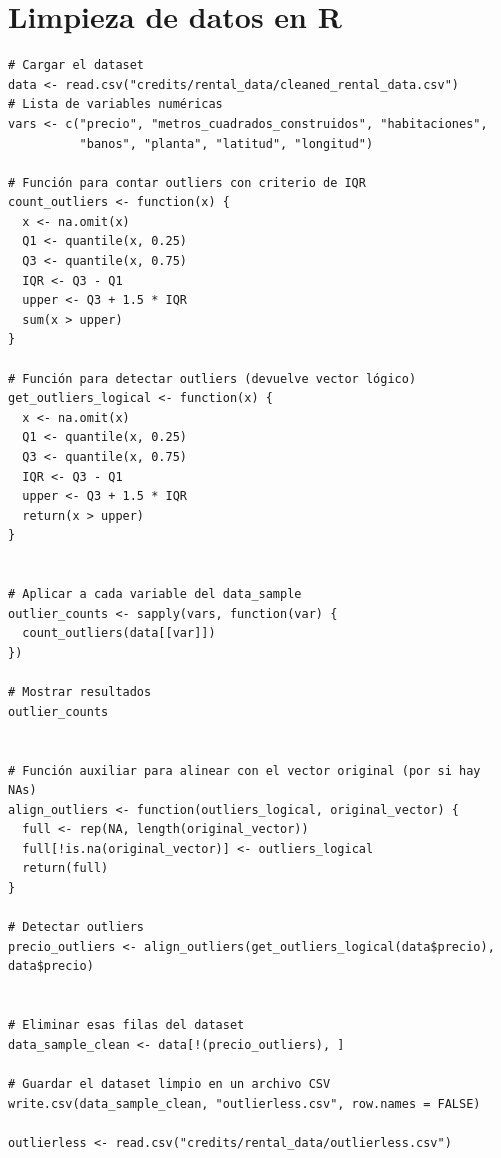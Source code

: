 \documentclass[11pt]{book}
\theoremstyle{plain} %
\theoremstyle{definition} %
\begin{document}
\section{Limpieza de datos en R}
 \begin{lstlisting}[style=rstyle, caption=clean\_data.R]
   # Cargar el dataset
data <- read.csv("credits/rental_data/cleaned_rental_data.csv")
# Lista de variables numéricas
vars <- c("precio", "metros_cuadrados_construidos", "habitaciones", 
          "banos", "planta", "latitud", "longitud")

# Función para contar outliers con criterio de IQR
count_outliers <- function(x) {
  x <- na.omit(x)
  Q1 <- quantile(x, 0.25)
  Q3 <- quantile(x, 0.75)
  IQR <- Q3 - Q1
  upper <- Q3 + 1.5 * IQR
  sum(x > upper)
}

# Función para detectar outliers (devuelve vector lógico)
get_outliers_logical <- function(x) {
  x <- na.omit(x)
  Q1 <- quantile(x, 0.25)
  Q3 <- quantile(x, 0.75)
  IQR <- Q3 - Q1
  upper <- Q3 + 1.5 * IQR
  return(x > upper)
}


# Aplicar a cada variable del data_sample
outlier_counts <- sapply(vars, function(var) {
  count_outliers(data[[var]])
})

# Mostrar resultados
outlier_counts


# Función auxiliar para alinear con el vector original (por si hay NAs)
align_outliers <- function(outliers_logical, original_vector) {
  full <- rep(NA, length(original_vector))
  full[!is.na(original_vector)] <- outliers_logical
  return(full)
}

# Detectar outliers
precio_outliers <- align_outliers(get_outliers_logical(data$precio), data$precio)


# Eliminar esas filas del dataset
data_sample_clean <- data[!(precio_outliers), ]

# Guardar el dataset limpio en un archivo CSV
write.csv(data_sample_clean, "outlierless.csv", row.names = FALSE)

outlierless <- read.csv("credits/rental_data/outlierless.csv")



 \end{lstlisting}
\end{document}
